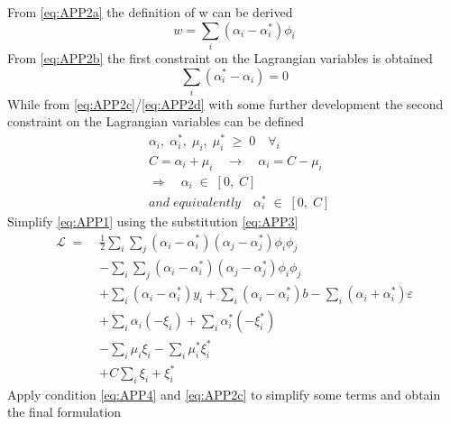 \documentclass[12pt]{article}
\newcommand{\Lagr}{\mathcal{L}}
\begin{document}
    From \eqref{eq:APP2a} the definition of w can be derived
    \begin{equation}\label{eq:APP3}
        w = \sum_i (\alpha_i - \alpha_i^*)\phi_i
    \end{equation}
    From \eqref{eq:APP2b} the first constraint on the Lagrangian variables is obtained
    \begin{equation}\label{eq:APP4}
        \sum_i (\alpha_i^* - \alpha_i) = 0
    \end{equation}
    While from \eqref{eq:APP2c}/\eqref{eq:APP2d} with some further development the second constraint on the Lagrangian variables can be defined
    \begin{equation*}
        \begin{aligned}
            &\alpha_i,\;\alpha_i^*,\;\mu_i,\;\mu_i^*\;\geq\;0 \quad \forall_i \\
            &C = \alpha_i + \mu_i\quad\longrightarrow\quad\alpha_i = C - \mu_i \\
            &\Longrightarrow\quad\alpha_i\;\in\;[0,\;C]\\
            &and\;equivalently\quad\alpha_i^*\;\in\;[0,\;C]
        \end{aligned}
    \end{equation*}
    Simplify \eqref{eq:APP1} using the substitution \eqref{eq:APP3}
    \begin{equation*}
        \begin{aligned}
            \Lagr\;=\;&\frac{1}{2} \sum_i \sum_j (\alpha_i - \alpha_i^*)(\alpha_j - \alpha_j^*)\phi_i\phi_j \\
            &-\sum_i \sum_j (\alpha_i - \alpha_i^*)(\alpha_j - \alpha_j^*)\phi_i\phi_j \\
            &+\sum_i (\alpha_i - \alpha_i^*)y_i
            +\sum_i (\alpha_i - \alpha_i^*)b
            -\sum_i (\alpha_i + \alpha_i^*)\varepsilon \\
            &+\sum_i \alpha_i(-\xi_i) + \sum_i\alpha_i^*(-\xi_i^*) \\
            &-\sum_i \mu_i\xi_i - \sum_i \mu_i^*\xi_i^* \\
            & +C\sum_i \xi_i + \xi_i^*
        \end{aligned}
    \end{equation*}
    Apply condition \eqref{eq:APP4} and \eqref{eq:APP2c} to simplify some terms and obtain the final formulation
\end{document}
